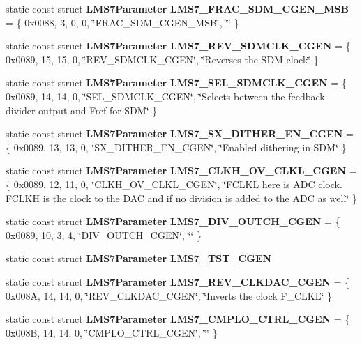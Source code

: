 \begin{DoxyCompactItemize}
\item 
static const struct {\bf L\+M\+S7\+Parameter} {\bf L\+M\+S7\+\_\+\+F\+R\+A\+C\+\_\+\+S\+D\+M\+\_\+\+C\+G\+E\+N\+\_\+\+M\+SB} = \{ 0x0088, 3, 0, 0, \char`\"{}\+F\+R\+A\+C\+\_\+\+S\+D\+M\+\_\+\+C\+G\+E\+N\+\_\+\+M\+S\+B\char`\"{}, \char`\"{}\char`\"{} \}
\item 
static const struct {\bf L\+M\+S7\+Parameter} {\bf L\+M\+S7\+\_\+\+R\+E\+V\+\_\+\+S\+D\+M\+C\+L\+K\+\_\+\+C\+G\+EN} = \{ 0x0089, 15, 15, 0, \char`\"{}\+R\+E\+V\+\_\+\+S\+D\+M\+C\+L\+K\+\_\+\+C\+G\+E\+N\char`\"{}, \char`\"{}\+Reverses the S\+D\+M clock\char`\"{} \}
\item 
static const struct {\bf L\+M\+S7\+Parameter} {\bf L\+M\+S7\+\_\+\+S\+E\+L\+\_\+\+S\+D\+M\+C\+L\+K\+\_\+\+C\+G\+EN} = \{ 0x0089, 14, 14, 0, \char`\"{}\+S\+E\+L\+\_\+\+S\+D\+M\+C\+L\+K\+\_\+\+C\+G\+E\+N\char`\"{}, \char`\"{}\+Selects between the feedback divider output and Fref for S\+D\+M\char`\"{} \}
\item 
static const struct {\bf L\+M\+S7\+Parameter} {\bf L\+M\+S7\+\_\+\+S\+X\+\_\+\+D\+I\+T\+H\+E\+R\+\_\+\+E\+N\+\_\+\+C\+G\+EN} = \{ 0x0089, 13, 13, 0, \char`\"{}\+S\+X\+\_\+\+D\+I\+T\+H\+E\+R\+\_\+\+E\+N\+\_\+\+C\+G\+E\+N\char`\"{}, \char`\"{}\+Enabled dithering in S\+D\+M\char`\"{} \}
\item 
static const struct {\bf L\+M\+S7\+Parameter} {\bf L\+M\+S7\+\_\+\+C\+L\+K\+H\+\_\+\+O\+V\+\_\+\+C\+L\+K\+L\+\_\+\+C\+G\+EN} = \{ 0x0089, 12, 11, 0, \char`\"{}\+C\+L\+K\+H\+\_\+\+O\+V\+\_\+\+C\+L\+K\+L\+\_\+\+C\+G\+E\+N\char`\"{}, \char`\"{}\+F\+C\+L\+K\+L here is A\+D\+C clock. F\+C\+L\+K\+H is the clock to the D\+A\+C and if no division is added to the A\+D\+C as well\char`\"{} \}
\item 
static const struct {\bf L\+M\+S7\+Parameter} {\bf L\+M\+S7\+\_\+\+D\+I\+V\+\_\+\+O\+U\+T\+C\+H\+\_\+\+C\+G\+EN} = \{ 0x0089, 10, 3, 4, \char`\"{}\+D\+I\+V\+\_\+\+O\+U\+T\+C\+H\+\_\+\+C\+G\+E\+N\char`\"{}, \char`\"{}\char`\"{} \}
\item 
static const struct {\bf L\+M\+S7\+Parameter} {\bf L\+M\+S7\+\_\+\+T\+S\+T\+\_\+\+C\+G\+EN}
\item 
static const struct {\bf L\+M\+S7\+Parameter} {\bf L\+M\+S7\+\_\+\+R\+E\+V\+\_\+\+C\+L\+K\+D\+A\+C\+\_\+\+C\+G\+EN} = \{ 0x008\+A, 14, 14, 0, \char`\"{}\+R\+E\+V\+\_\+\+C\+L\+K\+D\+A\+C\+\_\+\+C\+G\+E\+N\char`\"{}, \char`\"{}\+Inverts the clock F\+\_\+\+C\+L\+K\+L\char`\"{} \}
\item 
static const struct {\bf L\+M\+S7\+Parameter} {\bf L\+M\+S7\+\_\+\+C\+M\+P\+L\+O\+\_\+\+C\+T\+R\+L\+\_\+\+C\+G\+EN} = \{ 0x008\+B, 14, 14, 0, \char`\"{}\+C\+M\+P\+L\+O\+\_\+\+C\+T\+R\+L\+\_\+\+C\+G\+E\+N\char`\"{}, \char`\"{}\char`\"{} \}

\end{DoxyCompactItemize}
